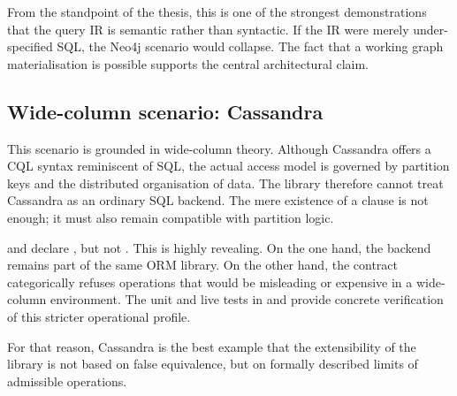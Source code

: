 From the standpoint of the thesis, this is one of the strongest demonstrations that the query IR is semantic rather than syntactic. If the IR were merely under-specified SQL, the Neo4j scenario would collapse. The fact that a working graph materialisation is possible supports the central architectural claim.

\subsection{Wide-column scenario: Cassandra}

This scenario is grounded in wide-column theory. Although Cassandra offers a CQL syntax reminiscent of SQL, the actual access model is governed by partition keys and the distributed organisation of data. The library therefore cannot treat Cassandra as an ordinary SQL backend. The mere existence of a  clause is not enough; it must also remain compatible with partition logic.

 and  declare , but not . This is highly revealing. On the one hand, the backend remains part of the same ORM library. On the other hand, the contract categorically refuses operations that would be misleading or expensive in a wide-column environment. The unit and live tests in  and  provide concrete verification of this stricter operational profile.

For that reason, Cassandra is the best example that the extensibility of the library is not based on false equivalence, but on formally described limits of admissible operations.

